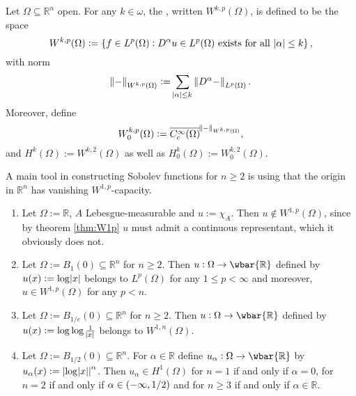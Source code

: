 \begin{definition}
	Let $\Omega \subseteq \mathbb{R}^n$ open. For any $k \in \omega$, the , written $W^{k,p}(\Omega)$, is defined to be the space
	\begin{equation*}
		W^{k,p}(\Omega) := \cbr[0]{f \in L^p(\Omega) : D^\alpha u \in L^p(\Omega) \text{ exists for all } \abs{\alpha} \leq k},
	\end{equation*}
	\noindent with norm
	\begin{equation*}
		\norm{-} _{W^{k,p}(\Omega)} := \sum_{\abs{\alpha} \leq k} \norm[0]{D^\alpha -}_{L^p(\Omega)}.
	\end{equation*}
	Moreover, define
	\begin{equation*}
		W^{k,p}_0(\Omega) := \overline{C^\infty_c(\Omega)}^{\norm{-}_{W^{k,p}(\Omega)}},
	\end{equation*}
	\noindent and $H^k(\Omega) := W^{k,2}(\Omega)$ as well as $H_0^k(\Omega) := W^{k,2}_0(\Omega)$.
\end{definition}

\begin{examples}
	A main tool in constructing Sobolev functions for $n \geq 2$ is using that the origin in $\mathbb{R}^n$ has vanishing $W^{1,p}$-capacity.
	\begin{enumerate}[label = \textup{(}\alph*\textup{)},wide=0pt]
		\item Let $\Omega := \mathbb{R}$, $A$ Lebesgue-measurable and $u := \chi_A$. Then $u \notin W^{1,p}(\Omega)$, since by theorem \ref{thm:W1p} $u$ must admit a continuous representant, which it obviously does not.
		\item Let $\Omega := B_1(0) \subseteq \mathbb{R}^n$ for $n \geq 2$. Then $u : \Omega \to \wbar{\mathbb{R}}$ defined by $u(x) := \log\abs{x}$ belongs to $L^p(\Omega)$ for any $1 \leq p < \infty$ and moreover, $u \in W^{1,p}(\Omega)$ for any $p < n$.
		\item Let $\Omega := B_{1/e}(0) \subseteq \mathbb{R}^n$ for $n \geq 2$. Then $u : \Omega \to \wbar{\mathbb{R}}$ defined by $u(x) := \log\log\frac{1}{\abs{x}}$ belongs to $W^{1,n}(\Omega)$.
		\item Let $\Omega := B_{1/2}(0) \subseteq \mathbb{R}^n$. For $\alpha \in \mathbb{R}$ define $u_\alpha : \Omega \to \wbar{\mathbb{R}}$ by $u_\alpha(x) := \abs[0]{\log\abs{x}}^\alpha$. Then $u_\alpha \in H^1(\Omega)$ for $n = 1$ if and only if $\alpha = 0$, for $n = 2$ if and only if $\alpha \in \intoo[0]{-\infty,1/2}$ and for $n \geq 3$ if and only if $\alpha \in \mathbb{R}$.
	\end{enumerate}
\end{examples}

